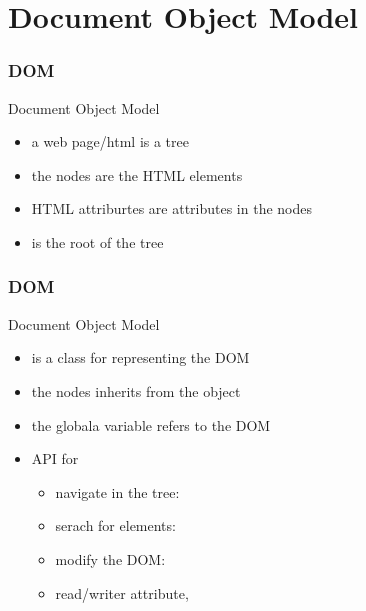 \section{Document Object Model}

\begin{frame}[fragile]
\frametitle{DOM}
\color{structure}
Document Object Model\\
\begin{itemize}\color{structure}
  \item a web page/html is a tree
  \item the nodes are the HTML elements
  \item HTML attriburtes are attributes in the nodes
  \item {} is the root of the tree
\end{itemize}
\end{frame}

\begin{frame}[fragile]
\frametitle{DOM}
\color{structure}
Document Object Model\\
\begin{itemize}\color{structure}
\item {} is a class for representing the DOM
\item the nodes inherits from the  object
\item the globala variable  refers to the DOM
\item API for
  \begin{itemize}
    \item navigate in the tree: 
    \item serach for elements: 
    \item modify the DOM: 
    \item read/writer attribute, 
  \end{itemize}
\end{itemize}
\end{frame}

